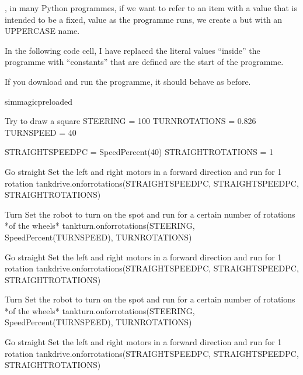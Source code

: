 \documentclass[letterpaper,10pt,english]{sphinxmanual}
\begin{document}
{, in many Python programmes, if we want to refer to an item with a value that is intended to be a fixed,  value as the programme runs, we create a  but with an UPPERCASE name.

In the following code cell, I have replaced the literal values “inside” the programme with “constants” that are defined are the start of the programme.

If you download and run the programme, it should behave as before.

{
\begin{sphinxVerbatim}[commandchars=\\\{\}]
\llap{\color{nbsphinxin}[ ]:\,\hspace{\fboxrule}\hspace{\fboxsep}}\PYGZpc{}\PYGZpc{}sim\PYGZus{}magic\PYGZus{}preloaded

\PYGZsh{} Try to draw a square
STEERING = \PYGZhy{}100
TURN\PYGZus{}ROTATIONS = 0.826
TURN\PYGZus{}SPEED = 40

STRAIGHT\PYGZus{}SPEED\PYGZus{}PC = SpeedPercent(40)
STRAIGHT\PYGZus{}ROTATIONS = 1

\PYGZsh{}Go straight
\PYGZsh{} Set the left and right motors in a forward direction
\PYGZsh{} and run for 1 rotation
tank\PYGZus{}drive.on\PYGZus{}for\PYGZus{}rotations(STRAIGHT\PYGZus{}SPEED\PYGZus{}PC, STRAIGHT\PYGZus{}SPEED\PYGZus{}PC, STRAIGHT\PYGZus{}ROTATIONS)

\PYGZsh{}Turn
\PYGZsh{} Set the robot to turn on the spot
\PYGZsh{} and run for a certain number of rotations *of the wheels*
tank\PYGZus{}turn.on\PYGZus{}for\PYGZus{}rotations(STEERING, SpeedPercent(TURN\PYGZus{}SPEED), TURN\PYGZus{}ROTATIONS)

\PYGZsh{}Go straight
\PYGZsh{} Set the left and right motors in a forward direction
\PYGZsh{} and run for 1 rotation
tank\PYGZus{}drive.on\PYGZus{}for\PYGZus{}rotations(STRAIGHT\PYGZus{}SPEED\PYGZus{}PC, STRAIGHT\PYGZus{}SPEED\PYGZus{}PC, STRAIGHT\PYGZus{}ROTATIONS)

\PYGZsh{}Turn
\PYGZsh{} Set the robot to turn on the spot
\PYGZsh{} and run for a certain number of rotations *of the wheels*
tank\PYGZus{}turn.on\PYGZus{}for\PYGZus{}rotations(STEERING, SpeedPercent(TURN\PYGZus{}SPEED), TURN\PYGZus{}ROTATIONS)

\PYGZsh{}Go straight
\PYGZsh{} Set the left and right motors in a forward direction
\PYGZsh{} and run for 1 rotation
tank\PYGZus{}drive.on\PYGZus{}for\PYGZus{}rotations(STRAIGHT\PYGZus{}SPEED\PYGZus{}PC, STRAIGHT\PYGZus{}SPEED\PYGZus{}PC, STRAIGHT\PYGZus{}ROTATIONS)


\end{sphinxVerbatim}}}
\end{document}
